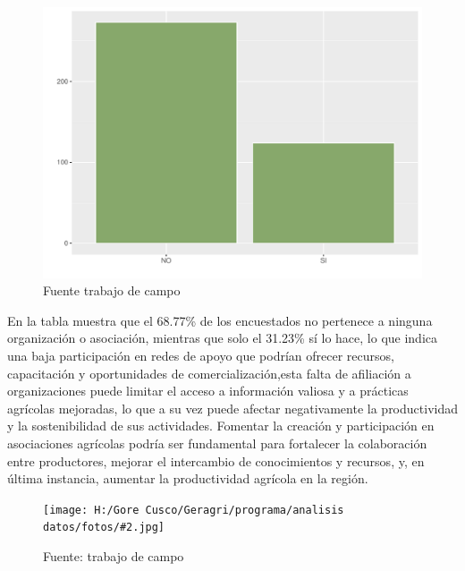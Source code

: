 \documentclass{article}\usepackage[]{graphicx}\usepackage[table]{xcolor}
\makeatletter
\def\maxwidth{ %
  \ifdim\Gin@nat@width>\linewidth
    \linewidth
  \else
    \Gin@nat@width
  \fi
}
\newenvironment{knitrout}{}{} %
\newenvironment{fotos}[2]
{\begin{figure}[H]
	\centering
	\caption{#1}
	\texttt{[image: H:/Gore Cusco/Geragri/programa/analisis datos/fotos/\#2.jpg]}
	\caption*{Fuente: trabajo de campo}}
{\end{figure}}
\newenvironment{graficas}[2]
{\begin{figure}[H]
		\centering
		\caption{#1}
		#2
		\caption*{Fuente trabajo de campo}}
{\end{figure}}
\makeatother
\begin{document}
\begin{graficas}
{Pertenece a alguna organizacion o asociacion}{
\begin{knitrout}
\definecolor{shadecolor}{rgb}{0.969, 0.969, 0.969}\color{fgcolor}
\includegraphics[width=\maxwidth]{figure/fig_treintaynueve-1} 
\end{knitrout}
}
\end{graficas}
En la tabla muestra que el 68.77\% de los encuestados no pertenece a ninguna organización o asociación, mientras que solo el 31.23\% sí lo hace, lo que indica una baja participación en redes de apoyo que podrían ofrecer recursos, capacitación y oportunidades de comercialización,esta falta de afiliación a organizaciones puede limitar el acceso a información valiosa y a prácticas agrícolas mejoradas, lo que a su vez puede afectar negativamente la productividad y la sostenibilidad de sus actividades. Fomentar la creación y participación en asociaciones agrícolas podría ser fundamental para fortalecer la colaboración entre productores, mejorar el intercambio de conocimientos y recursos, y, en última instancia, aumentar la productividad agrícola en la región.
\begin{fotos}
{trabajo de campo}{37}
\end{fotos}
\end{document}
